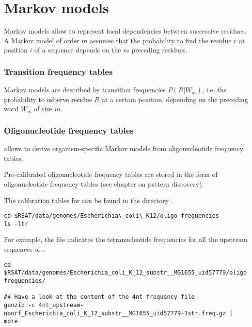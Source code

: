 
\chapter{Markov models}

Markov models allow to represent local dependencies between successive
residues. A Markov model of order $m$ assumes that the probability to
find the residue $r$ at position $i$ of a sequence depends on the
$m$ preceding residues.

\subsection{Transition frequency tables}

Markov models are described by transition frequencies $P(R|W_m)$,
i.e. the probability to osberve residue $R$ at a certain position,
depending on the preceding word $W_m$ of size $m$.

\subsection{Oligonucleotide frequency tables}

\RSAT allows to derive organism-specific Markov models from
oligonucleotide frequency tables.

Pre-calibrated oligonucleotide frequency tables are stored in the form
of oligonucleotide frequency tables (see chapter on pattern
discovery).

The calibration tables for  can be found in
the \RSAT directory .

\begin{small}
\begin{verbatim}
cd $RSAT/data/genomes/Escherichia\_coli\_K12/oligo-frequencies
ls -ltr
\end{verbatim}
\end{small}

For example, the file
indicates the tetranucleotide frequencies for all the upstream
sequences of .

\begin{small}
\begin{verbatim}
cd $RSAT/data/genomes/Escherichia_coli_K_12_substr__MG1655_uid57779/oligo-frequencies/

## Have a look at the content of the 4nt frequency file
gunzip -c 4nt_upstream-noorf_Escherichia_coli_K_12_substr__MG1655_uid57779-1str.freq.gz | more
\end{verbatim}
\end{small}

